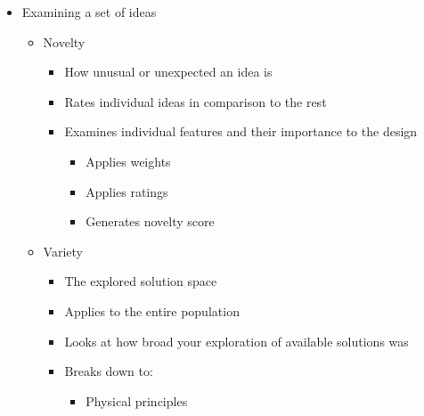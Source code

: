 \begin{itemize}

  \item Examining a set of ideas

    \begin{itemize}

      \item Novelty

        \begin{itemize}

          \item How unusual or unexpected an idea is

          \item Rates individual ideas in comparison to the rest

          \item Examines individual features and their importance to the design

            \begin{itemize}

              \item Applies weights

              \item Applies ratings

              \item Generates novelty score

            \end{itemize}
            
        \end{itemize}

      \item Variety

        \begin{itemize}

          \item The explored solution space

          \item Applies to the entire population

          \item Looks at how broad your exploration of available solutions was

          \item Breaks down to:

            \begin{itemize}

              \item Physical principles


\end{itemize}
\end{itemize}
\end{itemize}
\end{itemize}
